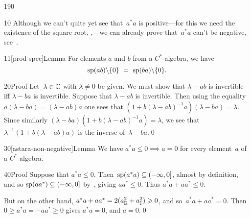 \begin{parsec}{190}
\begin{point}{10}%
Although we can't quite yet see that~$a^*a$
is positive---for this we need the existence of the square root, 
    ,---we
    can already prove that~$a^*a$ can't be negative,
    see~.
\end{point}
\begin{point}{11}[prod-spec]{Lemma}%
For elements $a$ and $b$ from a $C^*$-algebra,
we have
\begin{equation*}
\spec(ab)\backslash\{0\}\ =\ \spec(ba)\backslash\{0\}.
\end{equation*}
\begin{point}{20}{Proof}%
Let~$\lambda\in \mathbb{C}$ with $\lambda\neq 0$ be given.
We must show that $\lambda - ab$ is invertible
iff $\lambda - ba$ is invertible.
Suppose that $\lambda-ab$ is invertible.
Then using the equality $a(\lambda-ba)=(\lambda-ab)a$
one sees that $(1+b(\lambda-ab)^{-1}a)(\lambda-ba)=\lambda$.
Since similarly $(\lambda-ba)(1+b(\lambda-ab)^{-1}a)=\lambda$,
we see that $\lambda^{-1}(1+b(\lambda-ab)a)$
is the inverse of~$\lambda-ba$.\qed
\end{point}
\end{point}
\begin{point}{30}[astara-non-negative]{Lemma}%
We have $a^*a  \leq 0\implies a=0$
for every element~$a$ of a $C^*$-algebra.
\begin{point}{40}{Proof}%
Suppose that $a^*a\leq 0$.
Then~$\mathrm{sp}(a^*a)\subseteq (-\infty,0]$, almost by definition,
and so $\mathrm{sp}(aa^*)\subseteq (-\infty,0]$ by~,
giving $aa^*\leq 0$.
Thus $a^*a+aa^*\leq 0$.

But on the other hand, 
$a^*a+aa^* = 2(a_{\mathbb{R}}^2 + a_{\mathbb{I}}^2) \geqslant 0$,
and so~$a^*a+aa^*=0$.
Then $0\geq a^*a=-aa^*\geq 0$ gives $a^*a=0$,
and $a=0$.\qed
\end{point}
\end{point}
\end{parsec}
